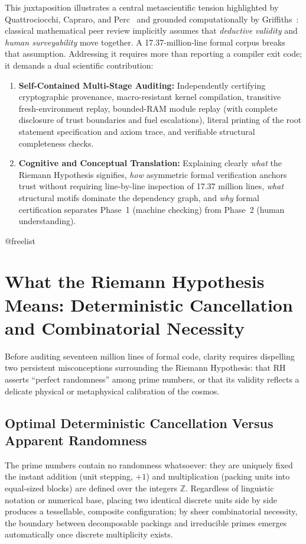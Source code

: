 \documentclass[11pt,a4paper]{article}
\makeatletter
\providecommand{\FloatBarrier}{%
  \par
  \expandafter\ifx\csname @freelist\endcsname\relax\else
    \ifx\@deferlist\@empty\else
      \clearpage
    \fi
  \fi
}
\let\orig@section\section
\renewcommand{\section}{\FloatBarrier\orig@section}
\makeatother
\begin{document}
This juxtaposition illustrates a central metascientific tension highlighted by Quattrociocchi, Capraro, and Perc~\cite{quattrociocchi2025} and grounded computationally by Griffiths~\cite{griffiths2026}: classical mathematical peer review implicitly assumes that \emph{deductive validity} and \emph{human surveyability} move together. A 17.37-million-line formal corpus breaks that assumption. Addressing it requires more than reporting a compiler exit code; it demands a dual scientific contribution:
\begin{enumerate}
  \item \textbf{Self-Contained Multi-Stage Auditing:} Independently certifying cryptographic provenance, macro-resistant kernel compilation, transitive fresh-environment replay, bounded-RAM module replay (with complete disclosure of trust boundaries and fuel escalations), literal printing of the root statement specification and axiom trace, and verifiable structural completeness checks.
  \item \textbf{Cognitive and Conceptual Translation:} Explaining clearly \emph{what} the Riemann Hypothesis signifies, \emph{how} asymmetric formal verification anchors trust without requiring line-by-line inspection of 17.37 million lines, \emph{what} structural motifs dominate the dependency graph, and \emph{why} formal certification separates Phase~1 (machine checking) from Phase~2 (human understanding).
\end{enumerate}

\section{What the Riemann Hypothesis Means: Deterministic Cancellation and Combinatorial Necessity}

Before auditing seventeen million lines of formal code, clarity requires dispelling two persistent misconceptions surrounding the Riemann Hypothesis: that RH asserts ``perfect randomness'' among prime numbers, or that its validity reflects a delicate physical or metaphysical calibration of the cosmos.

\subsection{Optimal Deterministic Cancellation Versus Apparent Randomness}

The prime numbers contain no randomness whatsoever: they are uniquely fixed the instant addition (unit stepping, $+1$) and multiplication (packing units into equal-sized blocks) are defined over the integers $\mathbb{Z}$. Regardless of linguistic notation or numerical base, placing two identical discrete units side by side produces a tessellable, composite configuration; by sheer combinatorial necessity, the boundary between decomposable packings and irreducible primes emerges automatically once discrete multiplicity exists.
\end{document}

